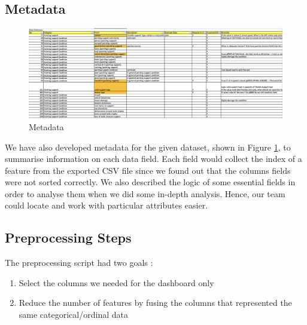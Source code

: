 \documentclass[11pt, oneside]{article}
\begin{document}
\subsection{Metadata}
\begin{figure}[H]
    \centering
    \includegraphics[scale=0.3]{images/Data_dict.png}
    \caption{Metadata}
    \label{Data_dict}
\end{figure}
We have also developed metadata for the given dataset, shown in Figure \ref{Data_dict}, to summarise information on each data field. Each field would collect the index of a feature from the exported CSV file since we found out that the columns fields were not sorted correctly. We also described the logic of some essential fields in order to analyse them when we did some in-depth analysis. Hence, our team could locate and work with particular attributes easier. 

\subsection{Preprocessing Steps}

The preprocessing script had two goals :
\begin{enumerate}
    \item Select the columns we needed for the dashboard only
    \item Reduce the number of features by fusing the columns that represented the same categorical/ordinal data
\end{enumerate}
\end{document}
